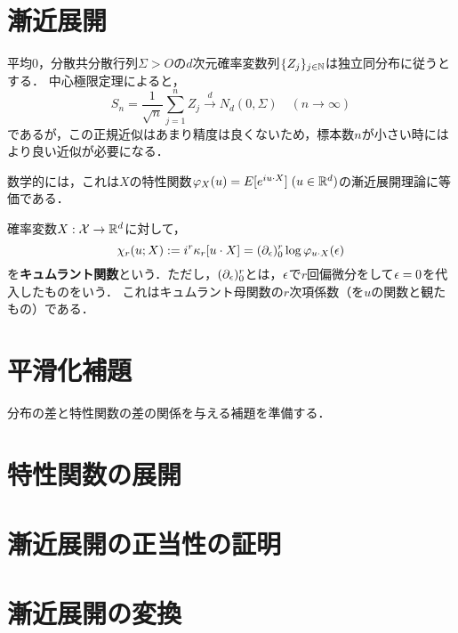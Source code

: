 \documentclass[uplatex,dvipdfmx]{jsreport}
\begin{document}
\section{漸近展開}

\begin{tcolorbox}[colframe=ForestGreen, colback=ForestGreen!10!white,breakable,colbacktitle=ForestGreen!40!white,coltitle=black,fonttitle=\bfseries\sffamily,
title=]
    平均$0$，分散共分散行列$\Sigma>O$の$d$次元確率変数列$\{Z_j\}_{j\in\mathbb{N}}$は独立同分布に従うとする．
    中心極限定理によると，
    \[S_n=\frac{1}{\sqrt{n}}\sum^n_{j=1}Z_j\xrightarrow{d}N_d(0,\Sigma)\quad(n\to\infty)\]
    であるが，この正規近似はあまり精度は良くないため，標本数$n$が小さい時にはより良い近似が必要になる．

    数学的には，これは$X$の特性関数$\varphi_X(u)=E[e^{iu\cdot X}]\;(u\in\mathbb{R}^d)$の漸近展開理論に等価である．
\end{tcolorbox}

\begin{definition}
    確率変数$X:\mathcal{X}\to\mathbb{R}^d$に対して，
    \[\chi_r(u;X):=i^r\kappa_r[u\cdot X]=(\partial_\epsilon)^r_0\log\varphi_{u\cdot X}(\epsilon)\]
    を\textbf{キュムラント関数}という．ただし，$(\partial_\epsilon)^r_0$とは，$\epsilon$で$r$回偏微分をして$\epsilon=0$を代入したものをいう．
    これはキュムラント母関数の$r$次項係数（を$u$の関数と観たもの）である．
\end{definition}

\section{平滑化補題}

\begin{tcolorbox}[colframe=ForestGreen, colback=ForestGreen!10!white,breakable,colbacktitle=ForestGreen!40!white,coltitle=black,fonttitle=\bfseries\sffamily,
title=]
    分布の差と特性関数の差の関係を与える補題を準備する．
\end{tcolorbox}

\section{特性関数の展開}

\section{漸近展開の正当性の証明}

\section{漸近展開の変換}
\end{document}
